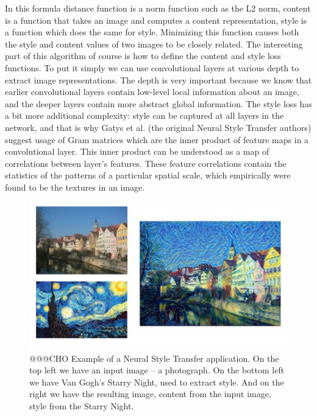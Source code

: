 \documentclass[b5paper]{book}
\begin{document}
In this formula distance function is a norm function such as the L2 norm, content is a function that takes an image and computes a content representation, style is a function which does the same for style. Minimizing this function causes both the style and content values of two images to be closely related. The interesting part of this algorithm of course is how to define the content and style loss functions. To put it simply we can use convolutional layers at various depth to extract image representations. The depth is very important because we know that earlier convolutional layers contain low-level local information about an image, and the deeper layers contain more abstract global information. The style loss has a bit more additional complexity: style can be captured at all layers in the network, and that is why Gatys et al. (the original Neural Style Transfer authors) suggest usage of Gram matrices which are the inner product of feature maps in a convolutional layer. This inner product can be understood as a map of correlations between layer's features.  These feature correlations contain the statistics of the patterns of a particular spatial scale, which empirically were found to be the textures in an image.

\begin{figure}
    \centering
    \includegraphics[scale=0.45]{figures/nst.png}
    \caption{@@@CHO Example of a Neural Style Transfer application. On the top left we have an input image -- a photograph. On the bottom left we have Van Gogh's Starry Night, used to extract style. And on the right we have the resulting image, content from the input image, style from the Starry Night.}
    \label{fig:nst}
\end{figure}
\end{document}

